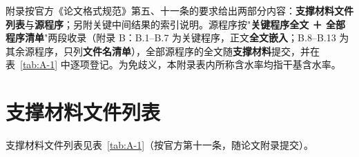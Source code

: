 \appendix
附录按官方《论文格式规范》第五、十一条的要求给出两部分内容：\textbf{支撑材料文件列表}与\textbf{源程序}；另附关键中间结果的索引说明。源程序按"\textbf{关键程序全文 ＋ 全部程序清单}"两段收录（附录 B：B.1–B.7 为关键程序，正文\textbf{全文嵌入}；B.8–B.13 为其余源程序，只列\textbf{文件名清单}），全部源程序的全文随\textbf{支撑材料}提交，并在表~\ref{tab:A-1} 中逐项登记。为免歧义，本附录表内所称含水率均指干基含水率。

\section{支撑材料文件列表}
支撑材料文件列表见表~\ref{tab:A-1}（按官方第十一条，随论文附录提交）。





